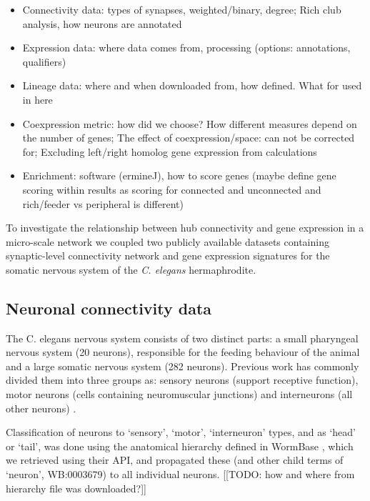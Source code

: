 \documentclass[10pt,letterpaper]{article}
\begin{document}
\begin{itemize}
    \item{Connectivity data: types of synapses, weighted/binary, degree; Rich club analysis, how neurons are annotated}
    \item{Expression data: where data comes from, processing (options: annotations, qualifiers)}
    \item{Lineage data: where and when downloaded from, how defined. What for used in here}
    \item{Coexpression metric: how did we choose? How different measures depend on the number of genes; The effect of coexpression/space: can not be corrected for; Excluding left/right homolog gene expression from calculations}
    \item{Enrichment: software (ermineJ), how to score genes (maybe define gene scoring within results as scoring for connected and unconnected and rich/feeder vs peripheral is different)}
\end{itemize}

To investigate the relationship between hub connectivity and gene expression in a micro-scale network we coupled two publicly available datasets containing synaptic-level connectivity network and gene expression signatures for the somatic nervous system of the \textit{C. elegans} hermaphrodite.

\subsection*{Neuronal connectivity data}

The C. elegans nervous system consists of two distinct parts: a small pharyngeal nervous system (20 neurons), responsible for  the feeding behaviour of the animal and a large somatic nervous system (282 neurons). 
Previous work has commonly divided them into three groups as:
sensory neurons (support receptive function),
motor neurons (cells containing neuromuscular junctions) and 
interneurons (all other neurons) \cite{White:1986tx}.

Classification of neurons to `sensory', `motor', `interneuron' types, and as `head' or `tail', was done using the anatomical hierarchy defined in WormBase \cite{Harris:2009kd}, which we retrieved using their API, and propagated these (and other child terms of `neuron', WB:0003679) to all individual neurons. [[TODO: how and where from hierarchy file was downloaded?]]%
\end{document}
